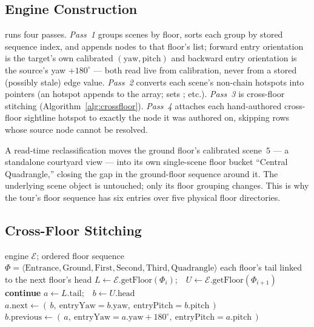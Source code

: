 \subsection{Engine Construction}
 runs four passes. \emph{Pass~1} groups scenes by
floor, sorts each group by stored sequence index, and appends nodes to that
floor's list; forward entry orientation is the target's own calibrated
$(\mathrm{yaw},\mathrm{pitch})$ and backward entry orientation is the
source's yaw $+180^{\circ}$ --- both read live from calibration, never from
a stored (possibly stale) edge value. \emph{Pass~2} converts each scene's
non-chain hotspots into  pointers (an
 hotspot appends to the  array; 
sets ; etc.). \emph{Pass~3} is cross-floor stitching
(Algorithm~\ref{alg:crossfloor}). \emph{Pass~4} attaches each
hand-authored cross-floor sightline hotspot to exactly the node it was
authored on, skipping rows whose source node cannot be resolved.

A read-time reclassification moves the ground floor's calibrated scene~$5$
--- a standalone courtyard view --- into its own single-scene floor bucket
``Central Quadrangle,'' closing the gap in the ground-floor sequence around
it. The underlying scene object is untouched; only its floor grouping
changes. This is why the tour's floor sequence has six entries over five
physical floor directories.

\subsection{Cross-Floor Stitching}
\begin{algorithm}[!t]
\caption{Cross-Floor Panorama Stitching (Pass 3)}
\label{alg:crossfloor}
\begin{algorithmic}[1]
\Require engine $\mathcal{E}$; ordered floor sequence
$\Phi = \langle\text{Entrance},\text{Ground},\text{First},\text{Second},\text{Third},\text{Quadrangle}\rangle$
\Ensure each floor's tail linked to the next floor's head
  \State $L \gets \mathcal{E}.\text{getFloor}(\Phi_i)$;\ \ $U \gets \mathcal{E}.\text{getFloor}(\Phi_{i+1})$
   \textbf{continue} \EndIf
  \State $a \gets L{.}\text{tail}$;\ \ $b \gets U{.}\text{head}$
  \State $a{.}\text{next} \gets (\,b,\ \mathrm{entryYaw}{=}b{.}\text{yaw},\ \mathrm{entryPitch}{=}b{.}\text{pitch}\,)$
  \State $b{.}\text{previous} \gets (\,a,\ \mathrm{entryYaw}{=}a{.}\text{yaw}{+}180^{\circ},\ \mathrm{entryPitch}{=}a{.}\text{pitch}\,)$
\EndFor
\end{algorithmic}
\end{algorithm}

